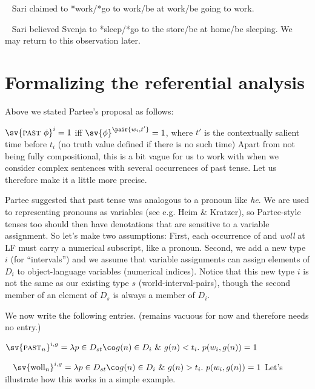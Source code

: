\ex~ Sari claimed to *work/*go to work/be at work/be going to work.\xe

\ex~ Sari believed Svenja to *sleep/*go to the store/be at home/be sleeping.
\label{ex:believe}\xe
%
We may return to this observation later.

\section{Formalizing the referential analysis}
\label{sec:formalizing-referential}

Above we stated Partee's proposal as follows:

\ex[exno=\ref{ex:past-syn}]%
$\sv{\past\ \phi}^{i} = 1$ iff $\sv{\phi}^{\pair{w_{i},t'}} = 1$, where $t'$
is the contextually salient\\ \hfill time before $t_{i}$ (no truth value defined
if there is no such time)
\xe
%
Apart from not being fully compositional, this is a bit vague for us to work
with when we consider complex sentences with several occurrences of past tense.
Let us therefore make it a little more precise.

Partee suggested that past tense was analogous to a pronoun like \emph{he}. We
are used to representing pronouns as variables (see e.g. Heim \& Kratzer), so
Partee-style tenses too should then have denotations that are sensitive to a
variable assignment. So let's make two assumptions: First, each occurrence of
\past and \emph{woll} at LF must carry a numerical subscript, like a pronoun.
Second, we add a new type $i$ (for ``intervals'') and we assume that variable
assignments can assign elements of $D_{i}$ to object-language variables
(numerical indices). Notice that this new type $i$ is not the same as our
existing type $s$ (world-interval-pairs), though the second member of an element
of $D_{s}$ is always a member of $D_{i}$.

We now write the following entries. (\pres remains vacuous for now and therefore
needs no entry.)

\ex $\sv{\past_{n}}^{i,g} = \lambda p\in D_{st}\co g(n) \in D_{i}\
\&\ g(n) < t_{i}.\ p(w_{i},g(n)) = 1$\label{ex:formal-past}\xe

\ex~ $\sv{\text{woll}_{n}}^{i,g} = \lambda p\in D_{st}\co g(n) \in D_{i}\
\&\ g(n) > t_{i}.\ p(w_{i},g(n)) = 1$\label{ex:formal-woll}\xe
%
Let's illustrate how this works in a simple example.

